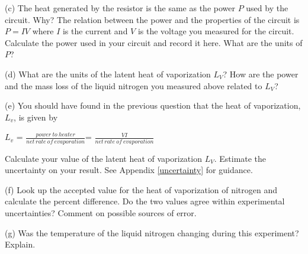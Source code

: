 (c) The heat generated by the resistor is the same as the power $P$ used by the circuit. Why?
The relation between the power and the properties of the circuit is $P= IV$ where
$I$ is the current and $V$ is the voltage you measured for the circuit.
Calculate the power used in your circuit and record it here.
What are the units of $P$?
\answerspace{20mm}

(d) What are the units of the latent heat of vaporization $L_V$?
How are  the power and the mass loss of the liquid nitrogen you 
measured above related to $L_V$?
\answerspace{20mm}

(e) You should have found in the previous question that the heat 
of vaporization, \(L_{v} \), is given by

{\centering \(L_{v} \) = \( \frac{power\: to\: heater}{net\, rate\: of\: evaporation} \)=
\( \frac{VI}{net\, rate\: of\: evaporation} \)\par}
Calculate your value of the latent heat of vaporization $L_V$. 
Estimate the uncertainty on your result.
See Appendix \ref{uncertainty} for guidance.
\answerspace{30mm}

(f) Look up the accepted value for the heat of vaporization of nitrogen
and calculate the percent difference. Do the two values agree within
experimental uncertainties? Comment on possible sources of error.
\answerspace{20mm}

(g) Was the temperature of the liquid nitrogen changing during this
experiment? Explain.

